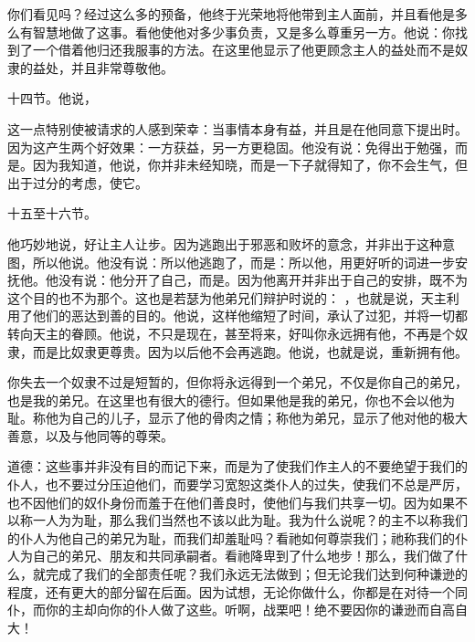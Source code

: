 你们看见吗？经过这么多的预备，他终于光荣地将他带到主人面前，并且看他是多么有智慧地做了这事。看他使他对多少事负责，又是多么尊重另一方。他说：你找到了一个借着他归还我服事的方法。在这里他显示了他更顾念主人的益处而不是奴隶的益处，并且非常尊敬他。\par

十四节。他说， \par

这一点特别使被请求的人感到荣幸：当事情本身有益，并且是在他同意下提出时。因为这产生两个好效果：一方获益，另一方更稳固。他没有说：免得出于勉强，而是。因为我知道，他说，你并非未经知晓，而是一下子就得知了，你不会生气，但出于过分的考虑，使它。\par

十五至十六节。 \par

他巧妙地说，好让主人让步。因为逃跑出于邪恶和败坏的意念，并非出于这种意图，所以他说。他没有说：所以他逃跑了，而是：所以他，用更好听的词进一步安抚他。他没有说：他分开了自己，而是。因为他离开并非出于自己的安排，既不为这个目的也不为那个。这也是若瑟为他弟兄们辩护时说的： ，也就是说，天主利用了他们的恶达到善的目的。他说，这样他缩短了时间，承认了过犯，并将一切都转向天主的眷顾。他说，不只是现在，甚至将来，好叫你永远拥有他，不再是个奴隶，而是比奴隶更尊贵。因为以后他不会再逃跑。他说，也就是说，重新拥有他。\par

 \par

你失去一个奴隶不过是短暂的，但你将永远得到一个弟兄，不仅是你自己的弟兄，也是我的弟兄。在这里也有很大的德行。但如果他是我的弟兄，你也不会以他为耻。称他为自己的儿子，显示了他的骨肉之情；称他为弟兄，显示了他对他的极大善意，以及与他同等的尊荣。\par

道德：这些事并非没有目的而记下来，而是为了使我们作主人的不要绝望于我们的仆人，也不要过分压迫他们，而要学习宽恕这类仆人的过失，使我们不总是严厉，也不因他们的奴仆身份而羞于在他们善良时，使他们与我们共享一切。因为如果不以称一人为为耻，那么我们当然也不该以此为耻。我为什么说呢？的主不以称我们的仆人为他自己的弟兄为耻，而我们却羞耻吗？看祂如何尊崇我们；祂称我们的仆人为自己的弟兄、朋友和共同承嗣者。看祂降卑到了什么地步！那么，我们做了什么，就完成了我们的全部责任呢？我们永远无法做到；但无论我们达到何种谦逊的程度，还有更大的部分留在后面。因为试想，无论你做什么，你都是在对待一个同仆，而你的主却向你的仆人做了这些。听啊，战栗吧！绝不要因你的谦逊而自高自大！\par

